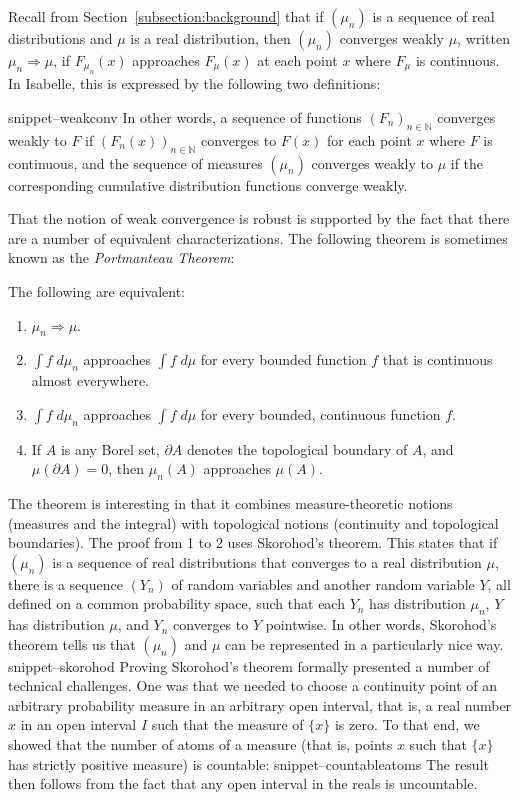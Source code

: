 \documentclass{svjour3}
\newcommand{\NN}{\mathbb{N}}
\newcommand{\Snippet}[1]{\csname snippet--#1\endcsname}
\begin{document}
Recall from Section~\ref{subsection:background} that if $(\mu_n)$ is a sequence of real distributions and $\mu$ is a real distribution, then $(\mu_n)$ converges weakly $\mu$, written $\mu_n \Rightarrow \mu$, if $F_{\mu_n}(x)$ approaches $F_\mu(x)$ at each point $x$ where $F_\mu$ is continuous. In Isabelle, this is expressed by the following two definitions:

\Snippet{weakconv}
In other words, a sequence of functions $(F_n)_{n \in \NN}$ converges weakly to $F$ if $(F_n(x))_{n \in \NN}$ converges to $F(x)$ for each point $x$ where $F$ is continuous, and the sequence of measures $(\mu_n)$ converges weakly to $\mu$ if the corresponding cumulative distribution functions converge weakly.

That the notion of weak convergence is robust is supported by the fact that there are a number of equivalent characterizations. The following theorem is sometimes known as the \emph{Portmanteau Theorem}:
\begin{theorem}
The following are equivalent:
\begin{enumerate}
 \item $\mu_n \Rightarrow \mu$.
 \item $\int f \; d\mu_n$ approaches $\int f \; d\mu$ for every bounded function $f$ that is continuous almost everywhere.
 \item $\int f \; d\mu_n$ approaches $\int f \; d\mu$ for every bounded, continuous function $f$.
 \item If $A$ is any Borel set, $\partial A$ denotes the topological boundary of $A$, and $\mu(\partial A) = 0$, then $\mu_n(A)$ approaches $\mu(A)$.
\end{enumerate}
\end{theorem}
The theorem is interesting in that it combines measure-theoretic notions (measures and the integral) with topological notions (continuity and topological boundaries). The proof from 1 to 2 uses Skorohod's theorem. This states that if $(\mu_n)$ is a sequence of real distributions that converges to a real distribution $\mu$, there is a sequence $(Y_n)$ of random variables and another random variable $Y$, all defined on a common probability space, such that each $Y_n$ has distribution $\mu_n$, $Y$ has distribution $\mu$, and $Y_n$ converges to $Y$ pointwise. In other words, Skorohod's theorem tells us that $(\mu_n)$ and $\mu$ can be represented in a particularly nice way.
\Snippet{skorohod}
Proving Skorohod's theorem formally presented a number of technical challenges. One was that we needed to choose a continuity point of an arbitrary probability measure in an arbitrary open interval, that is, a real number $x$ in an open interval $I$ such that the measure of $\{x\}$ is zero. To that end, we showed that the number of atoms of a measure (that is, points $x$ such that $\{x\}$ has strictly positive measure) is countable:
\Snippet{countableatoms}
The result then follows from the fact that any open interval in the reals is uncountable.
\end{document}
